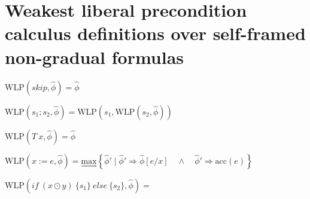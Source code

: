 \documentclass {article}
\newcommand{\eif}[3]{if \ ( #1 ) \ \{ #2 \} \ else \ \{#3\}}
\newcommand{\fphi}{\widehat{\phi}}
\newcommand{\acc}[1]{\text{acc}(#1)}
\newcommand{\imp}{\Rightarrow}
\newcommand{\maximp}[2]{\underset{\Rightarrow}{\text{max}}\left\{#1 \mid #2\right\}}
\newcommand{\wlp}[2]{\text{WLP}(#1,#2)}
\begin{document}

\section{Weakest liberal precondition calculus definitions over self-framed non-gradual formulas}
\hspace{0.5cm}

$\wlp{skip}{\fphi} = \fphi  $

\vspace{0.5cm}

$\wlp{s_1;s_2}{\fphi} = \wlp{s_1}{\wlp{s_2}{\fphi}} $

\vspace{0.5cm}



$\wlp{T\ x}{\fphi} = \fphi$

$\wlp{x := e}{\fphi} =\maximp{\fphi'}{\fphi' \imp \fphi[e/x] \quad \wedge \quad \fphi' \imp \acc{e}} $

\vspace{0.5cm}

$\wlp{\eif{x \odot y}{s_1}{s_2}}{\fphi} = $


\vspace{0.5cm}
\end{document}
